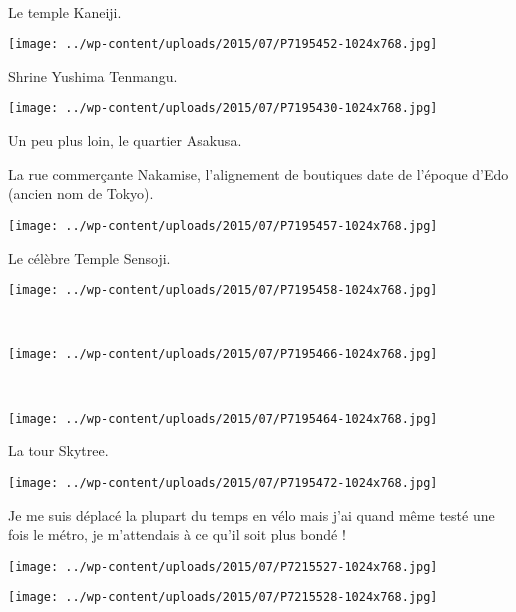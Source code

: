 ~

  Le temple Kaneiji.\\  
\begin{center} \texttt{[image: ../wp-content/uploads/2015/07/P7195452-1024x768.jpg]} \end{center}
\vspace{-\topsep}
\pagebreak

 Shrine Yushima Tenmangu.
\begin{center} \texttt{[image: ../wp-content/uploads/2015/07/P7195430-1024x768.jpg]} \end{center}

 Un peu plus loin, le quartier Asakusa.

 La rue commerçante Nakamise, l'alignement de boutiques date de l'\nobreak\hspace{0pt}époque d'Edo (ancien nom de Tokyo). 
\begin{center} \texttt{[image: ../wp-content/uploads/2015/07/P7195457-1024x768.jpg]} \end{center}
\vspace{-\topsep}
\pagebreak

 Le célèbre Temple Sensoji.
\begin{center} \texttt{[image: ../wp-content/uploads/2015/07/P7195458-1024x768.jpg]} \end{center}
~
\begin{center} \texttt{[image: ../wp-content/uploads/2015/07/P7195466-1024x768.jpg]} \end{center}
\vspace{-\topsep}
\pagebreak
~
\begin{center} \texttt{[image: ../wp-content/uploads/2015/07/P7195464-1024x768.jpg]} \end{center}

 La tour Skytree.
\begin{center} \texttt{[image: ../wp-content/uploads/2015/07/P7195472-1024x768.jpg]} \end{center}
\vspace{-\topsep}
\pagebreak

 Je me suis déplacé la plupart du temps en vélo mais j'ai quand même testé une fois le métro, je m'attendais à ce qu'il soit plus bondé ! 
\begin{center} \texttt{[image: ../wp-content/uploads/2015/07/P7215527-1024x768.jpg]} \end{center}
\begin{center} \texttt{[image: ../wp-content/uploads/2015/07/P7215528-1024x768.jpg]} \end{center}
\vspace{-\topsep}
\vspace{-2.75mm}
\pagebreak

